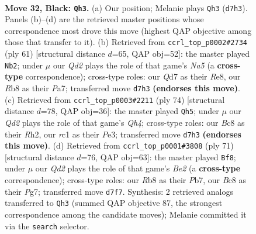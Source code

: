\documentclass[11pt]{article}
\begin{document}
\clearpage

\begin{figure}[p]\centering
\begin{subfigure}{0.46\textwidth}\centering
\resizebox{\linewidth}{!}{%
\newchessgame
\chessboard[
  setfen={1rb5/pp1q2k1/n5p1/2pP2pp/8/PB1Q1PP1/1P3K1P/2RR4 b - - 4 32},
  showmover=false,
  pgfstyle=straightmove, color=movearrow, markmove={d7-h3}
]}
\caption{}
\end{subfigure}\hfill
\begin{subfigure}{0.46\textwidth}\centering
\resizebox{\linewidth}{!}{%
\newchessgame
\chessboard[
  setfen={4r1k1/p2b1pp1/2q4p/1p1p3P/n2P1Q2/2P2P2/P5P1/1BR1B1K1 b - - 4 31},
  showmover=false,
  pgfstyle=straightmove, color=movearrow, markmove={a4-b2}
]}
\caption{}
\end{subfigure}
\\[4pt]
\begin{subfigure}{0.46\textwidth}\centering
\resizebox{\linewidth}{!}{%
\newchessgame
\chessboard[
  setfen={8/p2r2qk/1p1Bb1rp/4Pp2/P1p1pP1Q/2P1P3/5KPR/1R6 w - - 0 38},
  showmover=false,
  pgfstyle=straightmove, color=movearrow, markmove={h4-h5}
]}
\caption{}
\end{subfigure}\hfill
\begin{subfigure}{0.46\textwidth}\centering
\resizebox{\linewidth}{!}{%
\newchessgame
\chessboard[
  setfen={8/pp2bkp1/6q1/2npPpP1/2rp1P1R/P4Q2/1P3BK1/7R b - - 6 36},
  showmover=false,
  pgfstyle=straightmove, color=movearrow, markmove={e7-f8}
]}
\caption{}
\end{subfigure}
\caption{\textbf{Move 32, Black: \texttt{Qh3}.} (a) Our position; Melanie plays \texttt{Qh3} (\texttt{d7h3}). Panels (b)--(d) are the retrieved master positions whose correspondence most drove this move (highest QAP objective among those that transfer to it). (b) Retrieved from \texttt{ccrl\_top\_p0002\#2734} (ply 61) [structural distance $d$=65, QAP obj=52]: the master played \texttt{Nb2}; under $\mu$ our \emph{Qd2} plays the role of that game's \emph{Na5} (a \textbf{cross-type} correspondence); cross-type roles: our \emph{Q}d7 as their \emph{R}e8, our \emph{R}b8 as their \emph{P}a7; transferred move \texttt{d7h3} \textbf{(endorses this move)}. (c) Retrieved from \texttt{ccrl\_top\_p0003\#2211} (ply 74) [structural distance $d$=78, QAP obj=36]: the master played \texttt{Qh5}; under $\mu$ our \emph{Qd2} plays the role of that game's \emph{Qh4}; cross-type roles: our \emph{B}c8 as their \emph{R}h2, our \emph{r}c1 as their \emph{P}e3; transferred move \texttt{d7h3} \textbf{(endorses this move)}. (d) Retrieved from \texttt{ccrl\_top\_p0001\#3808} (ply 71) [structural distance $d$=76, QAP obj=63]: the master played \texttt{Bf8}; under $\mu$ our \emph{Qd2} plays the role of that game's \emph{Be2} (a \textbf{cross-type} correspondence); cross-type roles: our \emph{R}b8 as their \emph{P}b7, our \emph{B}c8 as their \emph{P}g7; transferred move \texttt{d7f7}. Synthesis: 2 retrieved analogs transferred to \texttt{Qh3} (summed QAP objective 87, the strongest correspondence among the candidate moves); Melanie committed it via the \texttt{search} selector.}
\label{fig:thought-m63}
\end{figure}
\end{document}
